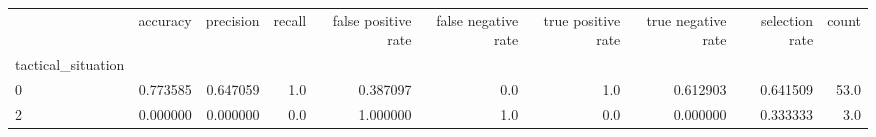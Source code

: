 \begin{tabular}{lrrrrrrrrr}
\toprule
{} &  accuracy &  precision &  recall &  false positive rate &  false negative rate &  true positive rate &  true negative rate &  selection rate &  count \\
tactical\_situation &           &            &         &                      &                      &                     &                     &                 &        \\
\midrule
0                  &  0.773585 &   0.647059 &     1.0 &             0.387097 &                  0.0 &                 1.0 &            0.612903 &        0.641509 &   53.0 \\
2                  &  0.000000 &   0.000000 &     0.0 &             1.000000 &                  1.0 &                 0.0 &            0.000000 &        0.333333 &    3.0 \\
\bottomrule
\end{tabular}
